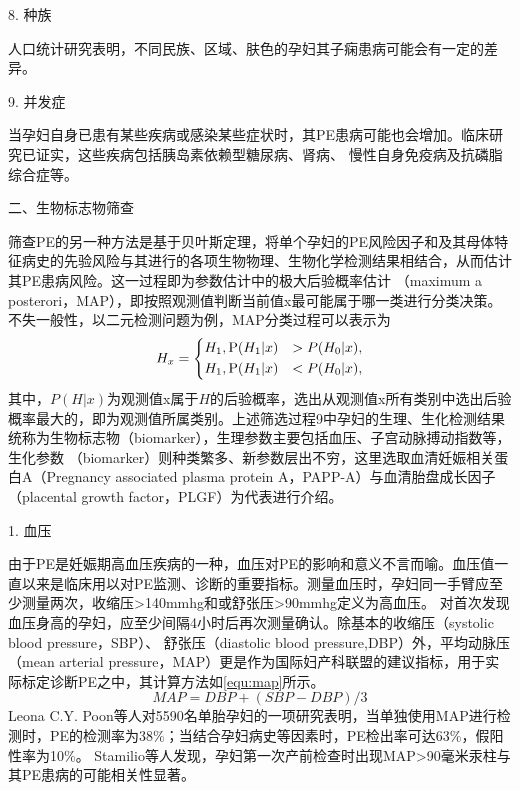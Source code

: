 8. 种族

人口统计研究表明，不同民族、区域、肤色的孕妇其子痫患病可能会有一定的差异\cite{Ghosh2014,Khalil2013}。

9. 并发症

当孕妇自身已患有某些疾病或感染某些症状时，其PE患病可能也会增加\cite{FIGO,Ray2016,OAG9}。临床研究已证实，这些疾病包括胰岛素依赖型糖尿病\cite{Lee2000,Garner1990}、肾病\cite{Martinell1990}、
慢性自身免疫病\cite{Stamilio2000}及抗磷脂综合症\cite{Dreyfus2001,Marchetti2016}等。

二、生物标志物筛查

筛查PE的另一种方法是基于贝叶斯定理，将单个孕妇的PE风险因子和及其母体特征病史的先验风险与其进行的各项生物物理、生物化学检测结果相结合，从而估计其PE患病风险\cite{FIGO}。这一过程即为参数估计中的极大后验概率估计
（maximum a posterori，MAP），即按照观测值判断当前值x最可能属于哪一类进行分类决策\cite{TJXHCL}。不失一般性，以二元检测问题为例，MAP分类过程可以表示为
\begin{equation}
    \label{equ:maxap}
    H_{x}=
    \left \{
    \begin{aligned}
        &H_{1}, \text P(H_{1}|x)&>P(H_{0}|x), \\
        &H_{1}, \text P(H_{1}|x)&<P(H_{0}|x),
    \end{aligned}
    \right.  
\end{equation}
其中，$P(H|x)$为观测值x属于$H$的后验概率，选出从观测值x所有类别中选出后验概率最大的，即为观测值所属类别。上述筛选过程9中孕妇的生理、生化检测结果统称为生物标志物（biomarker），生理参数主要包括血压、子宫动脉搏动指数等，生化参数
（biomarker）则种类繁多、新参数层出不穷\cite{Rene2008,Zhong2015,Zeisler2016,Rana2012}，这里选取血清妊娠相关蛋白A（Pregnancy associated plasma protein A，PAPP-A）与血清胎盘成长因子（placental growth factor，PLGF）为代表进行介绍。

1. 血压

由于PE是妊娠期高血压疾病的一种\cite{OAG9,HDASOM,2000s1}，血压对PE的影响和意义不言而喻。血压值一直以来是临床用以对PE监测、诊断的重要指标。测量血压时，孕妇同一手臂应至少测量两次，收缩压>140mmhg和或舒张压>90mmhg定义为高血压。
对首次发现血压身高的孕妇，应至少间隔4小时后再次测量确认\cite{OAG9}。除基本的收缩压（systolic blood pressure，SBP）、
舒张压（diastolic blood pressure,DBP）外，平均动脉压（mean arterial pressure，MAP）更是作为国际妇产科联盟的建议指标，用于实际标定诊断PE之中，其计算方法如\autoref{equ:map}所示\cite{FIGO}。
\begin{equation}
    \label{equ:map}
    MAP=DBP+(SBP-DBP)/3
\end{equation}
Leona C.Y. Poon\cite{Poon2008}等人对5590名单胎孕妇的一项研究表明，当单独使用MAP进行检测时，PE的检测率为38\%；当结合孕妇病史等因素时，PE检出率可达63\%，假阳性率为10\%。
Stamilio等人\cite{Stamilio2000}发现，孕妇第一次产前检查时出现MAP>90毫米汞柱与其PE患病的可能相关性显著。

